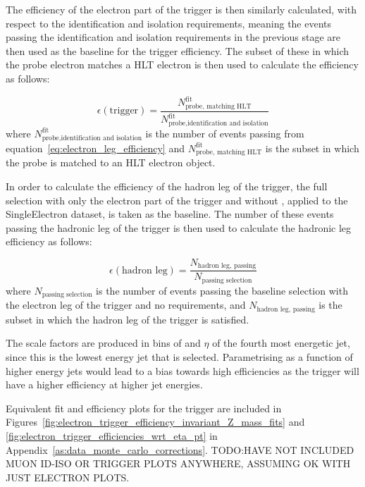 The efficiency of the electron part of the trigger is then similarly calculated, with respect to the
identification and isolation requirements, meaning the events passing the identification and isolation
requirements in the previous stage are then used as the baseline for the trigger efficiency. The subset of
these in which the probe electron matches a HLT electron is then used to calculate the efficiency as follows:

\begin{equation}
\epsilon(\text{trigger}) = \frac{N^{\text{fit}}_{\text{probe, matching HLT}}}{N^{\text{fit}}_{\text{probe,identification and isolation}}}
\label{eq:electron_leg_efficiency}
\end{equation}
where $N^{\text{fit}}_{\text{probe,identification and isolation}}$ is the number of
events passing from equation~\ref{eq:electron_leg_efficiency} and $N^{\text{fit}}_{\text{probe, matching
HLT}}$ is the subset in which the probe is matched to an HLT electron object.

In order to calculate the efficiency of the hadron leg of the trigger, the full selection with only the
electron part of the trigger and without \btagging, applied to the SingleElectron dataset, is taken as the
baseline. The number of these events passing the hadronic leg of the trigger is then used to calculate the
hadronic leg efficiency as follows:

\begin{equation}
\epsilon(\text{hadron leg}) = \frac{N_{\text{hadron leg, passing}}}{N_{\text{passing selection}}}
\end{equation}
where $N_{\text{passing selection}}$ is the number of events passing the baseline selection with
the electron leg of the trigger and no \btagging requirements, and $N_{\text{hadron leg, passing}}$ is the
subset in which the hadron leg of the trigger is satisfied.

The scale factors are produced in bins of \pt and $\eta$ of the fourth most energetic jet, since this is the
lowest energy jet that is selected. Parametrising as a function of higher energy jets would lead to a bias
towards high efficiencies as the trigger will have a higher efficiency at higher jet energies.

Equivalent fit and efficiency plots for the trigger are included in
Figures~\ref{fig:electron_trigger_efficiency_invariant_Z_mass_fits} and
\ref{fig:electron_trigger_efficiencies_wrt_eta_pt} in Appendix~\ref{as:data_monte_carlo_corrections}.
TODO:HAVE NOT INCLUDED MUON ID-ISO OR TRIGGER PLOTS ANYWHERE, ASSUMING OK WITH JUST ELECTRON PLOTS.
